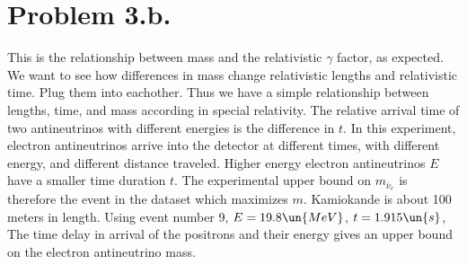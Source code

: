 \documentclass{article}
\begin{document}
\section*{Problem 3.b.}
This is the relationship between mass and the relativistic $\gamma$ factor, as expected. We want to see how differences in mass change relativistic lengths and relativistic time.
Plug them into eachother.
Thus we have a simple relationship between lengths, time, and mass according in special relativity.
The relative arrival time of two antineutrinos with different energies is the difference in $t$.
In this experiment, electron antineutrinos arrive into the detector at different times, with different energy, and different distance traveled. Higher energy electron antineutrinos $E$ have a smaller time duration $t$.  The experimental upper bound on $m_{\bar{\nu}_e}$ is therefore the event in the dataset which maximizes $m$. Kamiokande is about 100 meters in length. Using event number 9, $E=19.8\un{MeV}$, $t=1.915\un{s}$,
The time delay in arrival of the positrons and their energy gives an upper bound on the electron antineutrino mass.
\printbibliography
\end{document}
